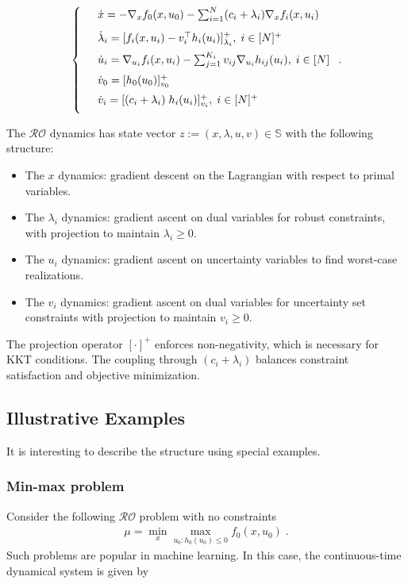 \documentclass[journal,twoside,web]{ieeecolor}
\newcommand{\rev}[1]{\textcolor{revisionblue}{#1}}
\begin{document}
\begin{align} \label{pd_dynamics}
\left\{
\begin{array}{cl}
\vspace{3mm}
&\dot x=-\nabla_x f_0(x,u_0)-  \sum_{i=1}^N(c_i+\lambda_i) \nabla_x f_i(x,u_i)\\
\vspace{2mm}
&\dot \lambda_i=[f_i(x,u_i)-v_i^\top h_i(u_i)]_{\lambda_i}^+,\; i\in[N]^+\\
\vspace{2mm}
&\dot u_i=\nabla_{u_i}f_i(x,u_i)-  \sum_{j=1}^{K_i} v_{ij} \nabla_{u_i} h_{ij}(u_i),\; i\in[N]\\
\vspace{2mm}
&\dot{v}_0=[h_0(u_0)]_{v_0}^+\\
\vspace{2mm}
&\dot v_i=[(c_i+\lambda_i) \; h_i(u_i)]_{v_i}^+,\;i\in[N]^+
\end{array}\right..
\end{align}

The $\mathcal{RO}$ dynamics has state vector $z:=(x,\lambda,u,v) \in \mathbb{S}$ with the following structure:

\begin{itemize}
\item The $x$ dynamics: gradient descent on the Lagrangian with respect to primal variables.
\item The $\lambda_i$ dynamics: gradient ascent on dual variables for robust constraints, with projection to maintain $\lambda_i \geq 0$.
\item The $u_i$ dynamics: gradient ascent on uncertainty variables to find worst-case realizations.
\item The $v_i$ dynamics: gradient ascent on dual variables for uncertainty set constraints with projection to maintain $v_i \geq 0$.
\end{itemize}

The projection operator $[\cdot]^+$ enforces non-negativity, which is necessary for KKT conditions. The coupling through $(c_i+\lambda_i)$ balances constraint satisfaction and objective minimization.

\subsection*{\rev{Illustrative Examples}} \label{examples_and_comments}
It is interesting to describe the structure using special examples.

\subsubsection{Min-max problem} Consider the following $\mathcal{RO}$ problem with no constraints
\begin{align*}
\mu=\min_x\max_{u_0:h_0(u_0)\leq 0}f_0(x,u_0)\;.
\end{align*}
Such problems are popular in machine learning. In this case, the continuous-time dynamical system is given by
\end{document}
